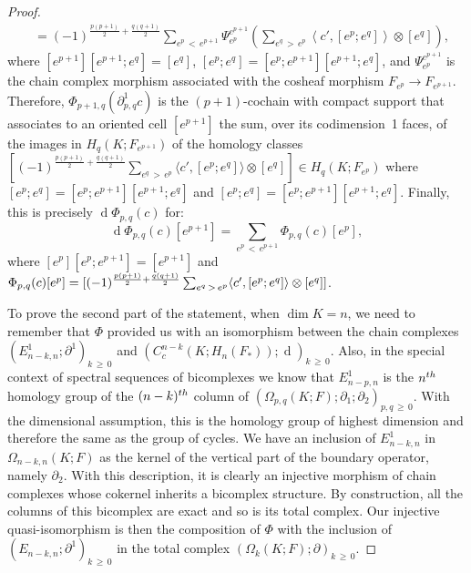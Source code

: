 \documentclass[10pt]{amsart}
\theoremstyle{definition}
\numberwithin{equation}{section}
\numberwithin{figure}{section}
\DeclareMathOperator{\df}{d}
\begin{document}
\begin{proof}
\begin{equation*}
\begin{split}
& = (-1)^{\frac{p(p+1)}{2}+\frac{q(q+1)}{2}}\sum_{e^p\,<\,e^{p+1}} \Psi_{e^p}^{e^{p+1}} \left(\sum_{e^q\,>\,e^{p}} \left\langle c',[e^{p};e^q]\right\rangle \otimes[e^q]\right),
\end{split}
\end{equation*}
where $[e^{p+1}][e^{p+1};e^q]=[e^q]$, $[e^{p};e^q]=[e^p;e^{p+1}][e^{p+1};e^q]$, and $\Psi_{e^p}^{e^{p+1}}$ is the chain complex morphism associated with the cosheaf morphism $F_{e^p}\rightarrow F_{e^{p+1}}$. Therefore, $\Phi_{p+1,q}(\partial^1_{p,q} c)$ is the $(p+1)$-cochain with compact support that associates to an oriented cell $[e^{p+1}]$ the sum, over its codimension~1 faces, of the images in $H_q(K;F_{e^{p+1}})$ of the homology classes $[(-1)^{\frac{p(p+1)}{2}+\frac{q(q+1)}{2}} \sum_{e^q\,>\,e^{p}} \langle c',[e^{p};e^q]\rangle \otimes[e^q]]\in H_q(K;F_{e^{p}})$ where $[e^{p};e^q]=[e^p;e^{p+1}][e^{p+1};e^q]$ and $[e^{p};e^q]=[e^p;e^{p+1}][e^{p+1};e^q]$. Finally, this is precisely $\df\Phi_{p,q}(c)$ for:
\begin{equation*}
\df\Phi_{p,q}(c)[e^{p+1}]=\sum_{e^p\,<\,e^{p+1}}\Phi_{p,q}(c)[e^p],
\end{equation*}
where $[e^{p}][e^{p};e^{p+1}]=[e^{p+1}]$ and $\Phi_{p,q}(c)[e^p]=[(-1)^{\frac{p(p+1)}{2}+\frac{q(q+1)}{2}} \sum_{e^q\,>\,e^{p}} \langle c',[e^{p};e^q]\rangle\linebreak \otimes[e^q]]$.


To prove the second part of the statement, when $\dim K=n$, we need to remember that $\Phi$ provided us with an isomorphism between the chain complexes $(E^1_{n-k,n};\partial^1)_{k\,\geq\,0}$ and $(C^{n-k}_c(K;H_n(F_*));\df)_{k\,\geq\,0}$. Also, in the special context of spectral sequences of bicomplexes we know that $E^1_{n-p,n}$ is the $n^{\rm th}$ homology group of the $(n-k)^{\rm th}$ column of $(\Omega_{p,q}(K;F);\partial_1;\partial_2)_{p,q\,\geq\,0}$. With the dimensional assumption, this is the homology group of highest dimension and therefore the same as the group of cycles. We have an inclusion of $E^1_{n-k,n}$ in $\Omega_{n-k,n}(K;F)$ as the kernel of the vertical part of the boundary operator, namely $\partial_2$. With this description, it is clearly an injective morphism of chain complexes whose cokernel inherits a bicomplex structure. By construction, all the columns of this bicomplex are exact and so is its total complex. Our injective quasi-isomorphism is then the composition of $\Phi$ with the inclusion of $(E_{n-k,n};\partial^1)_{k\,\geq\,0}$ in the total complex $(\Omega_k(K;F);\partial)_{k\,\geq\,0}$.
\end{proof}
\end{document}
